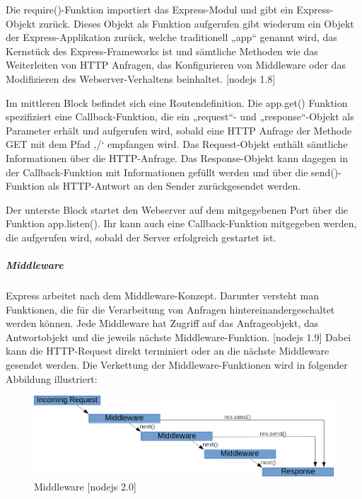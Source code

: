 Die require()-Funktion importiert das Express-Modul und gibt ein Express-Objekt zurück. 
Dieses Objekt als Funktion aufgerufen gibt wiederum ein Objekt der Express-Applikation zurück, welche traditionell „app“ genannt wird, das Kernstück des Express-Frameworks ist und sämtliche Methoden wie das Weiterleiten von HTTP Anfragen, das Konfigurieren von Middleware oder das Modifizieren des Webserver-Verhaltens beinhaltet. [nodejs 1.8]\newline 

Im mittleren Block befindet sich eine Routendefinition. Die app.get() Funktion spezifiziert eine Callback-Funktion, die ein „request“- und „response“-Objekt als Parameter erhält und aufgerufen wird, sobald eine HTTP Anfrage der Methode GET mit dem Pfad ‚/‘ empfangen wird. Das Request-Objekt enthält sämtliche Informationen über die HTTP-Anfrage. Das Response-Objekt kann dagegen in der Callback-Funktion mit Informationen gefüllt werden und über die send()-Funktion als HTTP-Antwort an den Sender zurückgesendet werden.\newline

Der unterste Block startet den Webserver auf dem mitgegebenen Port über die Funktion app.listen(). Ihr kann auch eine Callback-Funktion mitgegeben werden, die aufgerufen wird, sobald der Server erfolgreich gestartet ist.\newpage

\subparagraph{Middleware}
Express arbeitet nach dem Middleware-Konzept. Darunter versteht man Funktionen, die für die Verarbeitung von Anfragen hintereinandergeschaltet werden können. Jede Middleware hat Zugriff auf das Anfrageobjekt, das Antwortobjekt und die jeweils nächste Middleware-Funktion. [nodejs 1.9]
Dabei kann die HTTP-Request direkt terminiert oder an die nächste Middleware gesendet werden. Die Verkettung der Middleware-Funktionen wird in folgender Abbildung illustriert: \newline



\begin{figure}[h]
\centering
\includegraphics[width=12cm]{images/nodejs_middleware.png}
\caption{Middleware [nodejs 2.0]}
\end{figure}

